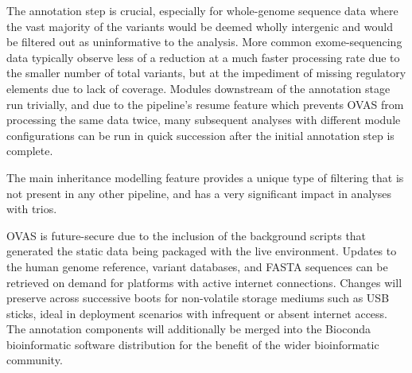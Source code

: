 \documentclass[twocolumn]{bmcart}%
\def\app{OVAS}
\newcounter{changeCount}
\newcommand{\changes}[1]{
	\stepcounter{changeCount}
	{\tiny\bf\color{violet}\arabic{changeCount}}
	{\color{red} #1}
}
\begin{document}
The annotation step is crucial, especially for whole-genome sequence data where the vast majority of the variants would be deemed wholly intergenic and would be filtered out as uninformative to the analysis. More common exome-sequencing data typically observe less of a reduction at a much faster processing rate due to the smaller number of total variants, but at the impediment of missing regulatory elements due to lack of coverage. Modules downstream of the annotation stage run trivially, and due to the pipeline's resume feature which prevents \app{} from processing the same data twice, many subsequent analyses with different module configurations can be run in quick succession after the initial annotation step is complete.

The main inheritance modelling feature provides a unique type of filtering that is not present in any other pipeline, and has a very significant impact in analyses with trios.

\app{} is future-secure due to the inclusion of the background scripts that generated the static data being packaged with the live environment. Updates to the human genome reference, variant databases, and FASTA sequences can be retrieved on demand for platforms with active internet connections. Changes will preserve across successive boots for non-volatile storage mediums such as USB sticks, ideal in deployment scenarios with infrequent or absent internet access. \changes{The annotation components will additionally be merged into the Bioconda \cite{gruening200683} bioinformatic software distribution for the benefit of the wider bioinformatic community.}




\end{document}
